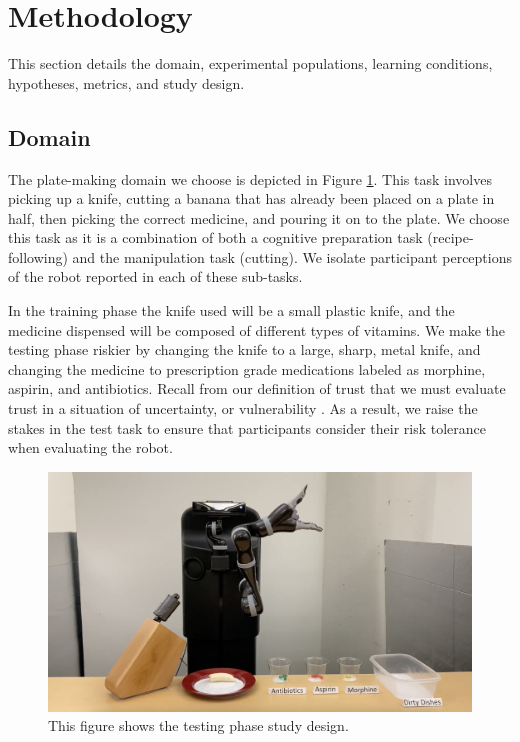 \documentclass[letterpaper]{article} %
\begin{document}

\section{Methodology}
\label{sec:methods}
This section details the domain, experimental populations, learning conditions, hypotheses, metrics, and study design. %

\subsection{Domain}
\label{sec:domain}
The plate-making domain we choose is depicted in Figure \ref{fig:study_setup}. This task involves picking up a knife, cutting a banana that has already been placed on a plate in half, then picking the correct medicine, and pouring it on to the plate. We choose this task as it is a combination of both a cognitive preparation task (recipe-following) and the manipulation task (cutting). We isolate participant perceptions of the robot reported in each of these sub-tasks.

In the training phase the knife used will be a small plastic knife, and the medicine dispensed will be composed of different types of vitamins. We make the testing phase riskier by changing the knife to a large, sharp, metal knife, and changing the medicine to prescription grade medications labeled as morphine, aspirin, and antibiotics. Recall from our definition of trust that we must evaluate trust in a situation of uncertainty, or vulnerability \cite{kohn_measurement_2021, ullman_what_2018}. As a result, we raise the stakes in the test task to ensure that participants consider their risk tolerance when evaluating the robot.

\begin{figure}[ht]
    \centering
    \includegraphics[width=1\columnwidth]{Figures/testing_setup.png}
  \caption{This figure shows the testing phase study design.}
    \label{fig:study_setup}
\end{figure}
\end{document}
